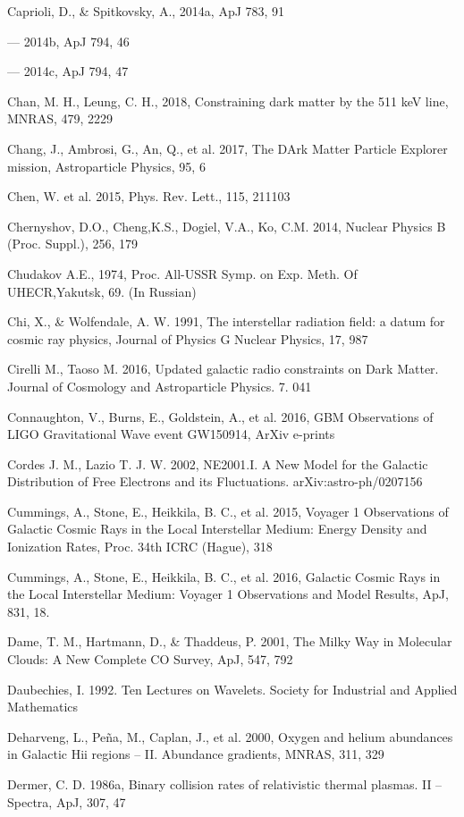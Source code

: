 Caprioli, D., \& Spitkovsky, A., 2014a, ApJ 783, 91

--- 2014b, ApJ 794, 46

--- 2014c, ApJ 794, 47

Chan, M. H., Leung, C. H., 2018, Constraining dark matter by the 511 keV line, MNRAS, 479, 2229

Chang, J., Ambrosi, G., An, Q., et al. 2017, The DArk Matter Particle Explorer mission, Astroparticle Physics, 95, 6

Chen, W. et al. 2015, Phys. Rev. Lett., 115, 211103

Chernyshov, D.O., Cheng,K.S., Dogiel, V.A., Ko, C.M. 2014, Nuclear Physics B (Proc. Suppl.), 256, 179

Chudakov A.E., 1974, Proc. All-USSR Symp. on Exp. Meth. Of UHECR,Yakutsk, 69. (In Russian)

Chi, X., \& Wolfendale, A. W. 1991, The interstellar radiation field: a datum for cosmic ray physics, Journal of Physics G Nuclear Physics, 17, 987

Cirelli M., Taoso M. 2016, Updated galactic radio constraints on Dark Matter. Journal of Cosmology and Astroparticle Physics. 7. 041

Connaughton, V., Burns, E., Goldstein, A., et al. 2016, \fermi{} GBM Observations of LIGO Gravitational Wave event GW150914, ArXiv e-prints

Cordes J. M., Lazio T. J. W. 2002, NE2001.I. A New Model for the Galactic Distribution of Free Electrons and its Fluctuations. arXiv:astro-ph/0207156

Cummings, A., Stone, E., Heikkila, B. C., et al. 2015, Voyager 1 Observations of Galactic Cosmic Rays in the Local Interstellar Medium: Energy Density and Ionization Rates, Proc. 34th ICRC (Hague), 318

Cummings, A., Stone, E., Heikkila, B. C., et al. 2016, Galactic Cosmic Rays in the Local Interstellar Medium: Voyager 1 Observations and Model Results, ApJ, 831, 18.

Dame, T. M., Hartmann, D., \& Thaddeus, P. 2001, The Milky Way in Molecular Clouds: A New Complete CO Survey, ApJ, 547, 792

Daubechies, I. 1992. Ten Lectures on Wavelets. Society for Industrial and Applied Mathematics

Deharveng, L., Pe\~{n}a, M., Caplan, J., et al. 2000, Oxygen and helium abundances in Galactic Hii regions -- II. Abundance gradients, MNRAS, 311, 329

Dermer, C. D. 1986a, Binary collision rates of relativistic thermal plasmas. II -- Spectra, ApJ, 307, 47

